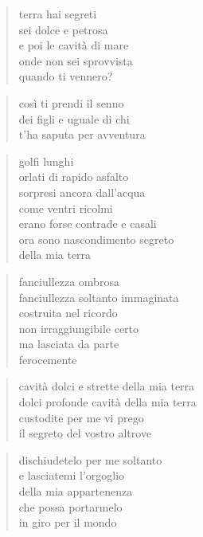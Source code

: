 	\begin{verse}
		terra hai segreti\\
		sei dolce e petrosa\\
		e poi le cavità di mare\\
		onde non sei sprovvista\\
		quando ti vennero?
	\end{verse}

	\begin{verse}
		così ti prendi il senno\\
		dei figli e uguale di chi\\
		t’ha saputa per avventura
	\end{verse}

\clearpage


	\begin{verse}
		golfi lunghi\\
		orlati di rapido asfalto\\
		sorpresi ancora dall’acqua\\
		come ventri ricolmi\\
		erano forse contrade e casali\\
		ora sono nascondimento segreto\\
		della mia terra
	\end{verse}

\clearpage


	\begin{verse}
		fanciullezza ombrosa\\
		fanciullezza soltanto immaginata\\
		costruita nel ricordo\\
		non irraggiungibile certo\\
		ma lasciata da parte\\
		ferocemente
	\end{verse}

	\begin{verse}
		cavità dolci e strette della mia terra\\
		dolci profonde cavità della mia terra\\
		custodite per me vi prego\\
		il segreto del vostro altrove
	\end{verse}

	\begin{verse}
		dischiudetelo per me soltanto\\
		e lasciatemi l’orgoglio\\
		della mia appartenenza\\
		che possa portarmelo\\
		in giro per il mondo
	\end{verse}

